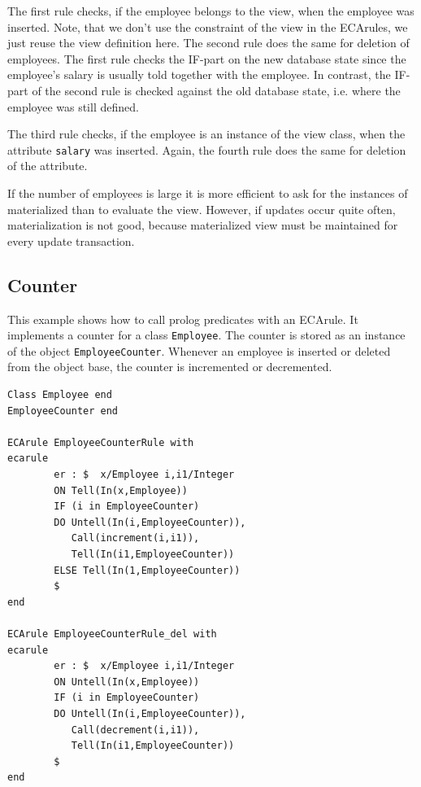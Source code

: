The first rule checks,
if the employee belongs to the view, when the employee
was inserted. Note, that we don't use
the constraint of the view in the ECArules, we just reuse
the view definition here. The second rule does the same
for deletion of employees. The first rule checks the
IF-part on the new database state since the employee's
salary is usually told together with the employee.
In contrast, the IF-part of the second rule is checked 
against the old database state, i.e. where the employee
was still defined.

The third rule checks, if the employee is an instance of the view class,
when the attribute {\tt salary} was inserted. Again, the fourth
rule does the same for deletion of the attribute.

If the number of employees is large it is more efficient to
ask for the instances of materialized than to evaluate the view.
However, if updates occur quite often, materialization is not
good, because materialized view must be maintained for every update
transaction.


\subsection{Counter}
\label{subsec:counter}

This example shows how to call prolog predicates with an ECArule.
It implements a counter for a class {\tt Employee}. The counter
is stored as an instance of the object {\tt EmployeeCounter}.
Whenever an employee is inserted or deleted from the object
base, the counter is incremented or decremented.

{\small
\begin{verbatim}
Class Employee end
EmployeeCounter end

ECArule EmployeeCounterRule with
ecarule
        er : $  x/Employee i,i1/Integer
        ON Tell(In(x,Employee))
        IF (i in EmployeeCounter)
        DO Untell(In(i,EmployeeCounter)),
           Call(increment(i,i1)),
           Tell(In(i1,EmployeeCounter))
        ELSE Tell(In(1,EmployeeCounter))
        $
end

ECArule EmployeeCounterRule_del with
ecarule
        er : $  x/Employee i,i1/Integer
        ON Untell(In(x,Employee))
        IF (i in EmployeeCounter)
        DO Untell(In(i,EmployeeCounter)),
           Call(decrement(i,i1)),
           Tell(In(i1,EmployeeCounter))
        $
end
\end{verbatim}
}


